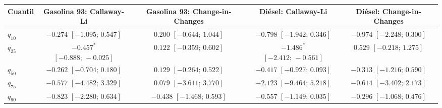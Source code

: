 \begin{tabular}{lcccc}
\toprule
Cuantil & Gasolina 93: Callaway-Li & Gasolina 93: Change-in-Changes & Diésel: Callaway-Li & Diésel: Change-in-Changes \\
\midrule
$q_{10}$ & $-0.274$ $[-1.095;\,0.547]$ & $0.200$ $[-0.644;\,1.044]$ & $-0.798$ $[-1.942;\,0.346]$ & $-0.974$ $[-2.248;\,0.300]$ \\
$q_{25}$ & $-0.457^{*}$ $[-0.888;\,-0.025]$ & $0.122$ $[-0.359;\,0.602]$ & $-1.486^{*}$ $[-2.412;\,-0.561]$ & $0.529$ $[-0.218;\,1.275]$ \\
$q_{50}$ & $-0.262$ $[-0.704;\,0.180]$ & $0.129$ $[-0.264;\,0.522]$ & $-0.417$ $[-0.927;\,0.093]$ & $-0.313$ $[-1.216;\,0.590]$ \\
$q_{75}$ & $-0.577$ $[-4.482;\,3.329]$ & $0.079$ $[-3.611;\,3.770]$ & $-2.123$ $[-9.464;\,5.218]$ & $-0.614$ $[-3.402;\,2.173]$ \\
$q_{90}$ & $-0.823$ $[-2.280;\,0.634]$ & $-0.438$ $[-1.468;\,0.593]$ & $-0.557$ $[-1.149;\,0.035]$ & $-0.296$ $[-1.068;\,0.476]$ \\
\bottomrule
\end{tabular}
